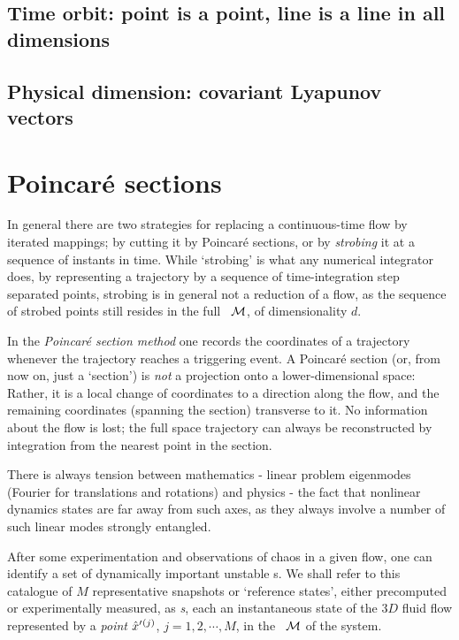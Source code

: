 \subsection{Time orbit: point is a point, line is a line in all dimensions}
\label{sect:TimeOrb}

\subsection{Physical dimension: covariant Lyapunov vectors}

\section{Poincar\'e sections}
\label{s:cut}

In general there are two strategies for replacing a continuous-time flow
by iterated mappings; by cutting it by Poincar\'e sections, or by
\emph{strobing} it at a sequence of instants in time. While
`strobing' is what any numerical integrator does, by representing a
trajectory by a sequence of time-integration step separated points,
strobing is in general not a reduction of a flow, as the sequence of
strobed points still resides in the full \statesp\ ${\cal M}$, of
dimensionality $d$.

In the {\em Poincar\'e section method} one records the coordinates of a
trajectory whenever the trajectory reaches a
triggering event. A Poincar\'e section (or, from now on,
just a `section') is {\em not} a projection onto a lower-dimensional space:
Rather, it is a local change of coordinates to a direction along the
flow, and the remaining coordinates (spanning the section) transverse to
it. No information about the flow is lost; the full
space trajectory can always be reconstructed by integration from the
nearest point in the section.

    \ifdraft\color{blue}
        There is always tension between mathematics - linear problem eigenmodes
        (Fourier for translations and rotations) and physics - the fact that
        nonlinear dynamics states are far away from such axes, as they
        always involve a number of such linear modes strongly entangled.
    \color{black}\fi


After some experimentation and observations of chaos in a given
flow, one can identify a set of dynamically important unstable
{\recurrStr s}.
We shall refer to this catalogue of $M$ representative snapshots or
`reference states', either precomputed or experimentally measured, as
\emph{\template s}, each an
instantaneous state of the $3D$ fluid flow represented by a \emph{point}
${\hat{x}'}{}^{(j)}$, $j=1,2,\cdots,M$, in the \statesp\ ${\cal M}$ of the
system.


